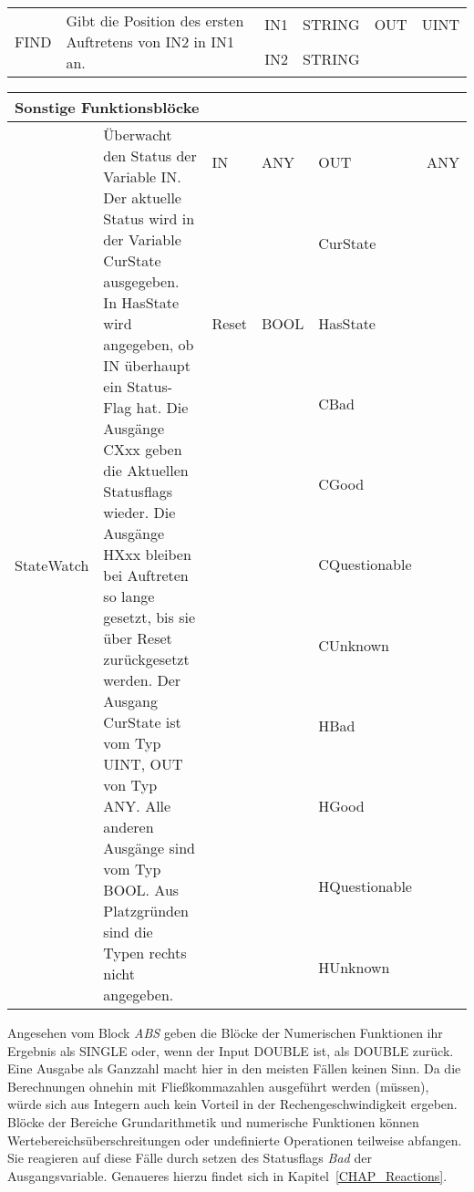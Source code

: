 {\begin{table}
\begin{tabular}{|m{2cm}|m{7cm}|>{\raggedright}m{0.5cm} >{\raggedleft}m{1.25cm}|>{\raggedright}m{0.5cm} >{\raggedleft\arraybackslash}m{1.25cm}|}
\hline
\multirow{2}{*}{FIND}&\multirow{2}{7cm}{Gibt die Position des ersten Auftretens von IN2 in IN1 an.}& IN1 & STRING & OUT & UINT\\
 & & IN2 & STRING & &\\
\hline
\end{tabular}
\renewcommand{\arraystretch}{1}
\end{table}
\begin{table}
\centering
\renewcommand{\arraystretch}{1.2}
\begin{tabular}{|m{2cm}|m{7cm}|>{\raggedright}m{0.5cm} >{\raggedleft}m{1.25cm}|>{\raggedright}m{0.5cm} >{\raggedleft\arraybackslash}m{1.25cm}|}
\hline
\multicolumn{6}{|l|}{\textbf{Sonstige Funktionsblöcke}}\\
\hline
\multirow{11}{*}{StateWatch}&\multirow{11}{7cm}{Überwacht den Status der Variable IN. Der aktuelle Status wird in der Variable CurState ausgegeben. In HasState wird angegeben, ob IN überhaupt ein Status-Flag hat. Die Ausgänge CXxx geben die Aktuellen Statusflags wieder. Die Ausgänge HXxx bleiben bei Auftreten so lange gesetzt, bis sie über Reset zurückgesetzt werden. Der Ausgang CurState ist vom Typ UINT, OUT von Typ ANY. Alle anderen Ausgänge sind vom Typ BOOL. Aus Platzgründen sind die Typen rechts nicht angegeben.}& IN & ANY & OUT & ANY\\
 & & & & CurState &\\ 
 & & Reset & BOOL & HasState &\\
 & & & & CBad &\\
 & & & & CGood &\\
 & & & & CQuestionable &\\
 & & & & CUnknown &\\
 & & & & HBad &\\
 & & & & HGood &\\
 & & & & HQuestionable &\\
 & & & & HUnknown &\\
\hline
\end{tabular}
\renewcommand{\arraystretch}{1}
\end{table}
}

Angesehen vom Block \textit{ABS} geben die Blöcke der Numerischen Funktionen ihr Ergebnis als SINGLE oder, wenn der Input DOUBLE ist, als DOUBLE zurück. Eine Ausgabe als Ganzzahl macht hier in den meisten Fällen keinen Sinn. Da die Berechnungen ohnehin mit Fließkommazahlen ausgeführt werden (müssen), würde sich aus Integern auch kein Vorteil in der Rechengeschwindigkeit ergeben.\\
Blöcke der Bereiche Grundarithmetik und numerische Funktionen können Wertebereichsüberschreitungen oder undefinierte Operationen teilweise abfangen. Sie reagieren auf diese Fälle durch setzen des Statusflags \textit{Bad} der Ausgangsvariable. Genaueres hierzu findet sich in Kapitel~\ref{CHAP_Reactions}.\\

